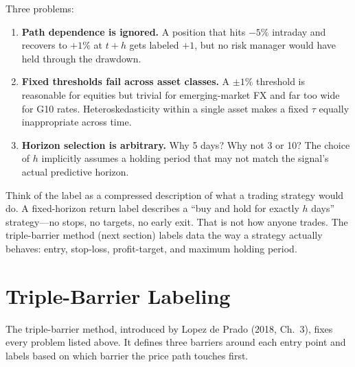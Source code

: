 Three problems:

\begin{enumerate}[leftmargin=2em]
\item \textbf{Path dependence is ignored.}
A position that hits $-5\%$ intraday and recovers to $+1\%$ at $t+h$
gets labeled $+1$, but no risk manager would have held through the drawdown.

\item \textbf{Fixed thresholds fail across asset classes.}
A $\pm 1\%$ threshold is reasonable for equities but trivial for
emerging-market FX and far too wide for G10 rates.
Heteroskedasticity within a single asset makes a fixed $\tau$ equally
inappropriate across time.

\item \textbf{Horizon selection is arbitrary.}
Why 5 days? Why not 3 or 10?
The choice of $h$ implicitly assumes a holding period that may not match
the signal's actual predictive horizon.
\end{enumerate}

\begin{intuition}
Think of the label as a compressed description of what a trading strategy
would do.
A fixed-horizon return label describes a ``buy and hold for exactly $h$
days'' strategy---no stops, no targets, no early exit.
That is not how anyone trades.
The triple-barrier method (next section) labels data the way a
strategy actually behaves: entry, stop-loss, profit-target, and
maximum holding period.
\end{intuition}


\section{Triple-Barrier Labeling}
\label{sec:triple-barrier}

The triple-barrier method, introduced by Lopez de Prado (2018, Ch.~3),
fixes every problem listed above.
It defines three barriers around each entry point and labels based on
which barrier the price path touches first.

